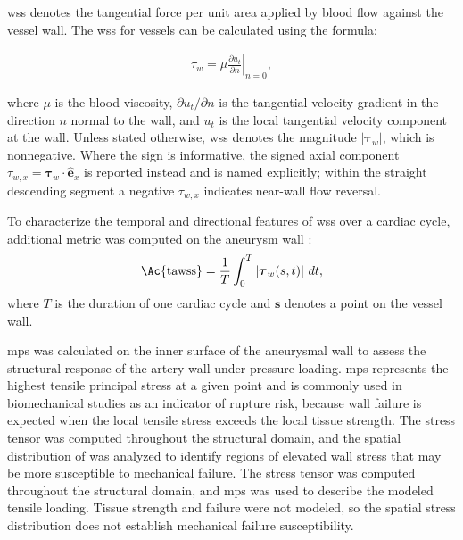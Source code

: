 \documentclass[12pt,a4paper]{article}
\newcommand{\cfdrevision}[1]{#1} %
\newcommand{\WSS}{\ac{wss}\xspace}
\newcommand{\MPS}{\ac{mps}\xspace}
\newcommand{\WSScap}{\Ac{wss}\xspace}
\newcommand{\TAWSScap}{\Ac{tawss}\xspace}
\newcommand{\MPScap}{\Ac{mps}\xspace}
\renewcommand{\vec}[1]{\boldsymbol{\mathbf{#1}}}
\theoremstyle{definition}
\numberwithin{equation}{section}
\providecommand{\DIFaddtex}[1]{{\protect\color{blue} \sf #1}} %
\providecommand{\DIFdeltex}[1]{{\protect\color{red} \scriptsize #1}} %
\providecommand{\DIFaddbegin}{} %
\providecommand{\DIFaddend}{} %
\providecommand{\DIFdelbegin}{} %
\providecommand{\DIFdelend}{} %
\providecommand{\DIFadd}[1]{\texorpdfstring{\DIFaddtex{#1}}{#1}} %
\providecommand{\DIFdel}[1]{\texorpdfstring{\DIFdeltex{#1}}{}} %
\newcommand{\DIFscaledelfig}{0.5}
\newlength{\DIFdelgraphicswidth} %
\newlength{\DIFdelgraphicsheight} %
\newcommand{\DIFaddincludegraphics}[2][]{{\color{blue}\fbox{\DIFOincludegraphics[#1]{#2}}}} %
\newcommand{\DIFdelincludegraphics}[2][]{%
\sbox{\DIFdelgraphicsbox}{\DIFOincludegraphics[#1]{#2}}%
\settoboxwidth{\DIFdelgraphicswidth}{\DIFdelgraphicsbox} %
\settoboxtotalheight{\DIFdelgraphicsheight}{\DIFdelgraphicsbox} %
\scalebox{\DIFscaledelfig}{%
\parbox[b]{\DIFdelgraphicswidth}{\usebox{\DIFdelgraphicsbox}\\[-\baselineskip] \rule{\DIFdelgraphicswidth}{0em}}\llap{\resizebox{\DIFdelgraphicswidth}{\DIFdelgraphicsheight}{%
\setlength{\unitlength}{\DIFdelgraphicswidth}%
\begin{picture}(1,1)%
\thicklines\linethickness{2pt} %
{\color[rgb]{1,0,0}\put(0,0){\framebox(1,1){}}}%
{\color[rgb]{1,0,0}\put(0,0){\line( 1,1){1}}}%
{\color[rgb]{1,0,0}\put(0,1){\line(1,-1){1}}}%
\end{picture}%
}\hspace*{3pt}}} %
} %
\DeclareRobustCommand{\DIFaddbegin}{\DIFOaddbegin \let\includegraphics\DIFaddincludegraphics} %
\DeclareRobustCommand{\DIFaddend}{\DIFOaddend \let\includegraphics\DIFOincludegraphics} %
\DeclareRobustCommand{\DIFdelbegin}{\DIFOdelbegin \let\includegraphics\DIFdelincludegraphics} %
\DeclareRobustCommand{\DIFdelend}{\DIFOaddend \let\includegraphics\DIFOincludegraphics} %
\begin{document}
\hspace*{\parindent} \WSScap  denotes the tangential force per unit area applied by blood flow against the vessel wall. The \WSS for vessels \cite{potters2015volumetric} can be calculated using the formula:

\begin{align}
    \tau_w = \mu \left. \frac{\partial {u_t}}{\partial n} \right|_{n=0},
\end{align}

where \(\mu\) is the blood viscosity, \(\partial u_t/\partial n\) is the tangential velocity gradient in the direction \(n\) normal to the wall, and \(u_t\) is the local tangential velocity component at the wall. Unless stated otherwise, \WSS denotes the magnitude \(|\vec{\tau}_w|\), which is nonnegative. Where the sign is informative, the signed axial component \(\tau_{w,x}=\vec{\tau}_w\cdot\hat{\vec{e}}_x\) is reported instead and is named explicitly; within the straight descending segment a negative \(\tau_{w,x}\) indicates near-wall flow reversal.

To characterize the temporal and directional features of \WSS over a cardiac cycle, additional metric was computed on the aneurysm wall \cite{morbiducci2010outflow, turk2021characterization}:
\begin{equation}
\mathrm{\TAWSScap} = \frac{1}{T}\int_{0}^{T} \left| \vec{\tau}_w(s,t) \right| \, dt,
\label{eq:tawss}
\end{equation}
where $T$ is the duration of one cardiac cycle and $\mathbf{s}$ denotes a point on the vessel wall. 

\MPScap was calculated on the inner surface of the aneurysmal wall to assess the structural response of the artery wall under pressure loading. \MPS represents the highest tensile principal stress at a given point and is commonly used in biomechanical studies as an indicator of rupture risk, because wall failure is expected when the local tensile stress exceeds the local tissue strength. \DIFdelbegin \DIFdel{The stress tensor was computed throughout the structural domain, and the spatial distribution of }%
\DIFdel{was analyzed to identify regions of elevated wall stress that may be more susceptible to mechanical failure.
}\DIFdelend \DIFaddbegin \DIFadd{\cfdrevision{The stress tensor was computed throughout the structural domain, and \MPS was used to describe the modeled tensile loading. Tissue strength and failure were not modeled, so the spatial stress distribution does not establish mechanical failure susceptibility.}
}\DIFaddend 
\end{document}
